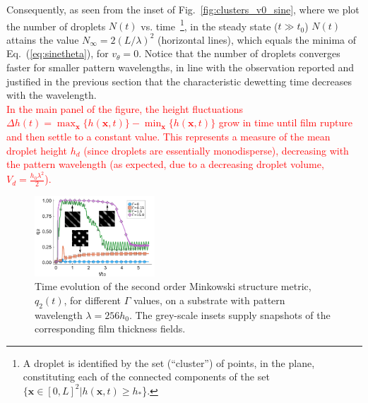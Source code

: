 \documentclass[twocolumn,amsmath,amssymb,showpacs,prl,superscriptaddress]{revtex4-1} %
\newcommand{\REV}[1]{\textcolor{red}{#1}}
\begin{document}
Consequently, as seen from the inset of Fig.~\ref{fig:clusters_v0_sine}, where we plot the number of droplets $N(t)$ vs. time~\footnote{A droplet is identified by the set (``cluster'') of points, in the plane, constituting each of the connected components of the set $\{\mathbf{x} \in [0,L]^2 | h(\mathbf{x},t) \geq h_{\ast}$\}.
},
in the steady state ($t \gg t_0$) $N(t)$ attains the value $N_{\infty} = 2(L/\lambda)^2$ (horizontal lines), which equals the minima of Eq.~(\ref{eq:sinetheta}), for $v_{\theta}=0$.
Notice that the number of droplets converges faster for smaller pattern wavelengths, in line with the observation reported and justified in the previous section that the characteristic dewetting time decreases with the wavelength.\\
\REV{In the main panel of the figure, the height fluctuations $\Delta h(t) = \max_{\mathbf{x}}\{h(\mathbf{x},t)\}-\min_{\mathbf{x}}\{h(\mathbf{x},t)\}$
grow in time until film rupture and then settle to a constant value. This represents a measure of the mean droplet height $h_d$ (since
droplets are essentially monodisperse), decreasing with the pattern wavelength (as expected, due to a decreasing droplet volume,
$V_d = \frac{h_0 \lambda^2}{2}$).}\\
\begin{figure}
    \centering
    \includegraphics[width=0.4\textwidth]{Figure_4.pdf}
    \caption{Time evolution of the second order Minkowski structure metric, $q_2(t)$, for different $\Gamma$ values, on a substrate with pattern wavelength $\lambda=256 h_0$.
    The grey-scale insets supply snapshots of the corresponding film thickness fields.}
    \label{fig:msm_q2}
\end{figure}
\end{document}

